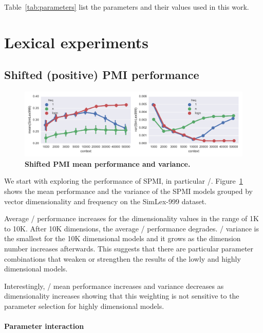 \documentclass[11pt,letterpaper]{article}
\begin{document}
Table~\ref{tab:parameters} list the parameters and their values used in this work.

\section{Lexical experiments}
\label{sec:lexical-experiments}

\subsection{Shifted (positive) PMI performance}

\begin{figure}
  \centering
  \includegraphics[width=\textwidth]{supplement/figures/simlex-ppmi}
  \caption{\textbf{Shifted PMI mean performance and variance.}}
  \label{fig:ppmi-performance}
\end{figure}

We start with exploring the performance of SPMI, in particular \SPMI/. Figure~\ref{fig:ppmi-performance} shows the mean performance and the variance of the SPMI models grouped by vector dimensionality and frequency on the SimLex-999 dataset.

Average \SPMI/ performance increases for the dimensionality values in the range of 1K to 10K. After 10K dimensions, the average \SPMI/ performance degrades. \SPMI/ variance is the smallest for the 10K dimensional models and it grows as the dimension number increases afterwards. This suggests that there are particular parameter combinations that weaken or strengthen the results of the lowly and highly dimensional models.

Interestingly, \logNSPMI/ mean performance increases and variance decreases as dimensionality increases showing that this weighting is not sensitive to the parameter selection for highly dimensional models.

\paragraph{Parameter interaction}
\end{document}
